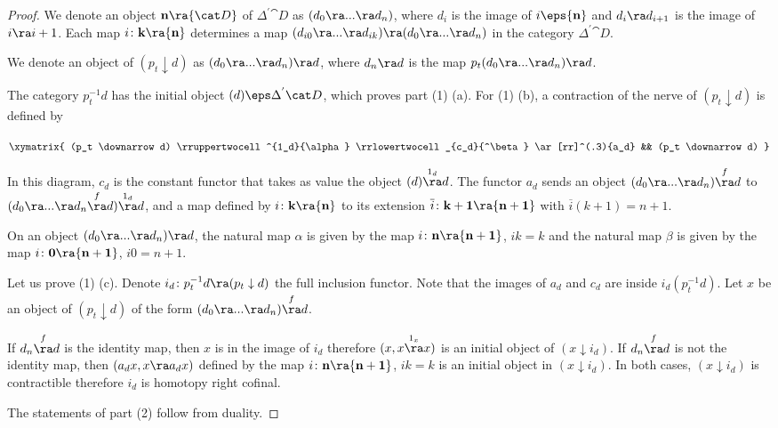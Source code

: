 \begin{proof}
We denote an object ${\bf n} \ra {\cat D}$ of $\Delta^{'}{\cat D}$ as $(d_0 \ra ... \ra d_n)$, where $d_i$ is the image of $i \eps {\bf n}$ and $d_i \ra d_{i+1}$ is the image of $i \ra i+1$. Each map $i \colon {\bf k} \ra {\bf n}$ determines a map $(d_{i0} \ra ... \ra d_{ik}) \ra (d_0 \ra ... \ra d_n)$ in the category $\Delta^{'}{\cat D}$.

We denote an object of $(p_t \downarrow d)$ as $(d_0 \ra ... \ra d_n) \ra d$, where $d_n \ra d$ is the map $p_t (d_0 \ra ... \ra d_n) \ra d$.

The category $p_t^{-1}d$ has the initial object $(d) \eps \Delta^{'}{\cat D}$, which proves part (1) (a). For (1) (b), a contraction of the nerve of $(p_t \downarrow d)$ is defined by
\begin{center}
$\xymatrix{
    (p_t \downarrow d) \rruppertwocell^{1_d}{\alpha} \rrlowertwocell_{c_d}{^\beta} \ar[rr]^(.3){a_d} && (p_t \downarrow d)
  }$
\end{center}

In this diagram, $c_d$ is the constant functor that takes as value the object $(d) \overset{1_d}{\ra} d$. The functor $a_d$ sends an object $(d_0 \ra ... \ra d_n) \overset{f}{\ra} d$ to $(d_0 \ra ... \ra d_n \overset{f}{\ra} d) \overset{1_d}{\ra} d$, and a map defined by $i \colon {\bf k} \ra {\bf n}$ to its extension $\overline{i} \colon {\bf k+1} \ra {\bf n+1}$ with $\overline{i}(k+1) = n+1$.

On an object $(d_0 \ra ... \ra d_n) \ra d$, the natural map $\alpha$ is given by the map $i \colon {\bf n} \ra {\bf n+1}$, $ik = k$ and the natural map $\beta$ is given by the map $i \colon {\bf 0} \ra {\bf n+1}$, $i0 = n+1$.

Let us prove (1) (c). Denote $i_d \colon p_t^{-1}d \ra (p_t \downarrow d)$ the full inclusion functor. Note that the images of $a_d$ and $c_d$ are inside $i_d(p_t^{-1}d)$. Let $x$ be an object of $(p_t \downarrow d)$ of the form $(d_0 \ra ... \ra d_n) \overset{f}{\ra} d$. 

If $d_n \overset{f}{\ra} d$ is the identity map, then $x$ is in the image of $i_d$ therefore $(x, x \overset{1_x}{\ra} x)$ is an initial object of $(x \downarrow i_d)$. If $d_n \overset{f}{\ra} d$ is not the identity map, then $(a_d x, x \ra a_d x)$ defined by the map $i \colon {\bf n} \ra {\bf n+1}$, $ik = k$ is an initial object in $(x \downarrow i_d)$. In both cases, $(x \downarrow i_d)$ is contractible therefore $i_d$ is homotopy right cofinal.

The statements of part (2) follow from duality.
\end{proof}

